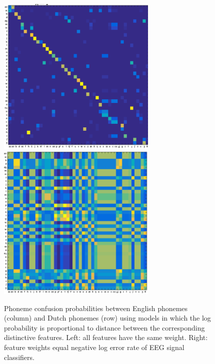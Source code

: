 \begin{figure}
  \centerline{
    \includegraphics[width=3in]{../figs/mirbagheri_dist_features.png}
    \includegraphics[width=3in]{../figs/mirbagheri_dist_eeg.png}
  }
  \caption{Phoneme confusion probabilities between English phonemes
    (column) and Dutch phonemes (row) using models in which the log
    probability is proportional to distance between the corresponding
    distinctive features.  Left: all features have the same
    weight.  Right: feature weights equal negative log error rate of
    EEG signal classifiers.}
  \label{fig:eeg_confusions}
\end{figure}
